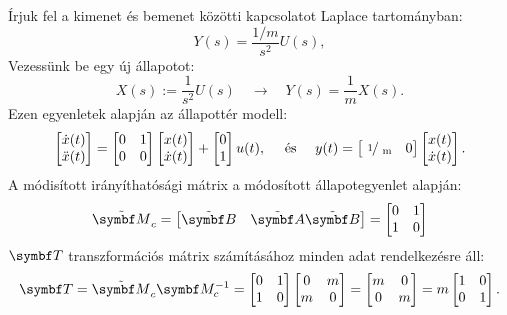 Írjuk fel a kimenet és bemenet közötti kapcsolatot Laplace tartományban:
\begin{equation}
  Y(s) = \frac{1 / m}{s^2} U(s),
\end{equation}
Vezessünk be egy új állapotot:
\begin{equation}
  X(s):=\frac{1}{s^2} U(s)
  \quad \rightarrow \quad
  Y(s) = \frac{1}{m} X(s).
\end{equation}
Ezen egyenletek alapján az állapottér modell:
\begin{equation}
  \begin{bmatrix}
    \dot x(t) \\ \ddot x(t)
  \end{bmatrix} = \begin{bmatrix}
    0 & 1 \\ 0 & 0
  \end{bmatrix} \begin{bmatrix}
    x(t) \\ \dot x(t)
  \end{bmatrix} + \begin{bmatrix}
    0 \\ 1
  \end{bmatrix} u(t),
  \quad \text{ és } \quad
  y(t) = \begin{bmatrix}
    \slashfrac{1}{m} & 0
  \end{bmatrix} \begin{bmatrix}
    x(t) \\ \dot x(t)
  \end{bmatrix}.
\end{equation}
A módisított irányíthatósági mátrix a módosított állapotegyenlet alapján:
\begin{equation}
  \tmat M_c = \begin{bmatrix}
    \tmat B & \tmat A \tmat B
  \end{bmatrix} = \begin{bmatrix}
    0 & 1 \\
    1 & 0
  \end{bmatrix}
\end{equation}
$\rmat T$ transzformációs mátrix számításához minden adat rendelkezésre áll:
\begin{equation}
  \rmat T
  = \tmat M_c \rmat M_c^{-1}
  = \begin{bmatrix}
    0 & 1 \\ 1 & 0
  \end{bmatrix} \begin{bmatrix}
    0 & m \\ m & 0
  \end{bmatrix} = \begin{bmatrix}
    m & 0 \\ 0 & m
  \end{bmatrix} = m \begin{bmatrix}
    1 & 0 \\ 0 & 1
  \end{bmatrix}.
\end{equation}
